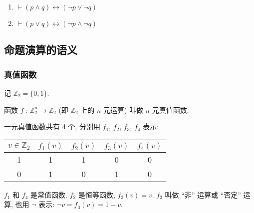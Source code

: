 \documentclass[
    color=black,
    device=normal,
    lang=cn
]{elegantnote}
\begin{document}
\begin{proposition}[De. Morgan 律]
    \begin{enumerate}[label=$\arabic*^\circ$, topsep = -1em]
        \item $\vdash (p\land q)\leftrightarrow (\lnot p\lor \lnot q)$
        \item $\vdash (p\lor q)\leftrightarrow (\lnot p\land \lnot q)$
    \end{enumerate}
\end{proposition}
\subsection{命题演算的语义}
\subsubsection{真值函数}
记 $\mathbb{Z}_2=\{0,1\}$.
\begin{definition}[真值函数]
    函数 $f\ :\ \mathbb{Z}_2^n\to\mathbb{Z}_2$ (即 $\mathbb{Z}_2$ 上的 $n$ 元运算) 叫做 $n$ 元真值函数.
\end{definition}
\begin{example}[一元真值函数]
    一元真值函数共有 4 个, 分别用 $f_1$, $f_2$, $f_3$, $f_4$ 表示:
    \begin{center}
        \begin{tabular}{c|cccc}
            $v\in\mathbb{Z}_2$ & $f_1(v)$ & $f_2(v)$ & $f_3(v)$ & $f_4(v)$ \\
            \hline
            1                  & 1        & 1        & 0        & 0        \\
            0                  & 1        & 0        & 1        & 0
        \end{tabular}
    \end{center}
    $f_1$ 和 $f_4$ 是常值函数.
    $f_2$ 是恒等函数, $f_2(v)=v$.
    $f_3$ 叫做 ``非'' 运算或 ``否定'' 运算, 也用 $\lnot$ 表示: $\lnot v=f_3(v)=1-v$.
\end{example}
\end{document}
